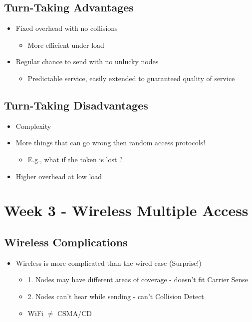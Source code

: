 \documentclass[12pt]{ctexart}   %
\begin{document}
	\subsection{Turn-Taking Advantages}
	\begin{itemize}
		\item Fixed overhead with no collisions
		\begin{itemize}
			\item More efficient under load 
		\end{itemize}
		
		\item Regular chance to send with no unlucky nodes
		\begin{itemize}
			\item Predictable service, easily extended to guaranteed quality of service
		\end{itemize}
	\end{itemize}
	
	\subsection{Turn-Taking Disadvantages}
	\begin{itemize}
		\item Complexity
		\item More things that can go wrong then random access protocols!
		\begin{itemize}
			\item E.g., what if the token is lost ?
		\end{itemize}
		\item Higher overhead at low load
	\end{itemize}

\section{Week 3 - Wireless Multiple Access}
	\subsection{Wireless Complications}
	\begin{itemize}
		\item Wireless is more complicated than the wired case (Surprise!)
		\begin{itemize}
			\item {\color{blue} 1.} Nodes may have different areas of coverage - doesn't fit Carrier Sense
			\item {\color{blue} 2.} Nodes can't hear while sending - can't Collision Detect
			\item WiFi $\neq$ CSMA/CD
		\end{itemize}
	\end{itemize}
	
\end{document}
